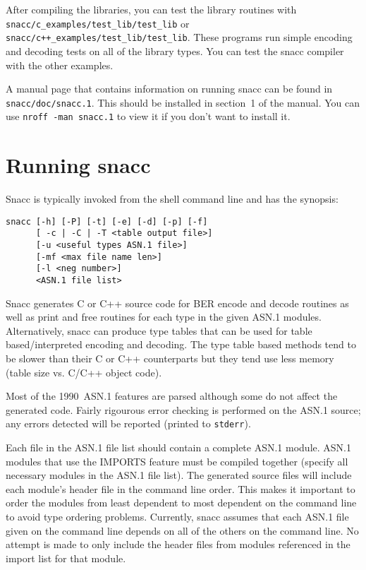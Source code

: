 After compiling the libraries, you can test the library routines with
\linebreak \verb$snacc/c_examples/test_lib/test_lib$ or \linebreak
\verb$snacc/c++_examples/test_lib/test_lib$.  These programs run
simple encoding and decoding tests on all of the library types.  You
can test the snacc compiler with the other examples.

A manual page that contains information on running snacc can be found in
\verb$snacc/doc/snacc.1$.  This should be installed in section~1 of
the manual.  You can use \verb$nroff -man snacc.1$ to view it if you
don't want to install it.


\section{\label{old-run-section}Running snacc}

Snacc is typically invoked from the shell command line and has the synopsis:
\begin{verbatim}
snacc [-h] [-P] [-t] [-e] [-d] [-p] [-f]
      [ -c | -C | -T <table output file>]
      [-u <useful types ASN.1 file>]
      [-mf <max file name len>]
      [-l <neg number>]
      <ASN.1 file list>
\end{verbatim}

Snacc generates C or C++ source code for BER encode and decode
routines as well as print and free routines for each type in the given
ASN.1 modules.  Alternatively, snacc can produce type tables that can
be used for table based/interpreted encoding and decoding.  The type
table based methods tend to be slower than their C or C++ counterparts
but they tend use less memory (table size vs. C/C++ object code).

Most of the 1990~ASN.1 features are parsed although some do not affect
the generated code.  Fairly rigourous error checking is performed on
the ASN.1 source; any errors detected will be reported (printed to
\verb$stderr$).

Each file in the ASN.1 file list should contain a complete ASN.1
module.  ASN.1 modules that use the IMPORTS feature must be compiled
together (specify all necessary modules in the ASN.1 file list).  The
generated source files will include each module's header file in the
command line order.  This makes it important to order the modules from
least dependent to most dependent on the command line to avoid type
ordering problems. Currently, snacc assumes that each ASN.1 file
given on the command line depends on all of the others on the command
line.  No attempt is made to only include the header files from
modules referenced in the import list for that module.

